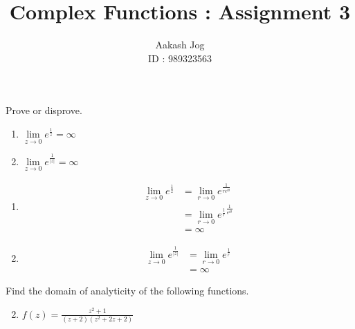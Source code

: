 \documentclass[fleqn, a4paper, 11pt, oneside]{amsart}
\title{Complex Functions : Assignment 3}
\author
{
	Aakash Jog\\
	ID : 989323563
}
\date{\formatdate{18}{11}{2015}}
\theoremstyle{definition}
\theoremstyle{theorem}
\begin{document}

\maketitle

\setcounter{question}{0}
\begin{question}
	Prove or disprove.
	\begin{enumerate}
		\item $\lim\limits_{z \to 0} e^{\frac{1}{z}} = \infty$
		\item $\lim\limits_{z \to 0} e^{\frac{1}{|z|}} = \infty$
	\end{enumerate}
\end{question}

\begin{solution}
	\begin{enumerate}[leftmargin=*]
		\item
			\begin{align*}
				\lim\limits_{z \to 0} e^{\frac{1}{z}} & = \lim\limits_{r \to 0} e^{\frac{1}{r e^{i \theta}}}               \\
                                                                      & = \lim\limits_{r \to 0} {e^{\frac{1}{r}}}^{\frac{1}{e^{i \theta}}} \\
                                                                      & = \infty
			\end{align*}
		\item
			\begin{align*}
				\lim\limits_{z \to 0} e^{\frac{1}{|z|}} & = \lim\limits_{r \to 0} e^{\frac{1}{r}} \\
                                                                        & = \infty
			\end{align*}
	\end{enumerate}
\end{solution}

\setcounter{question}{1}
\begin{question}
	Find the domain of analyticity of the following functions.
	\begin{enumerate}
		\setcounter{enumi}{1}
		\item $f(z) = \frac{z^2 + 1}{(z + 2) \left( z^2 + 2 z + 2 \right)}$
	\end{enumerate}
\end{question}
\end{document}

